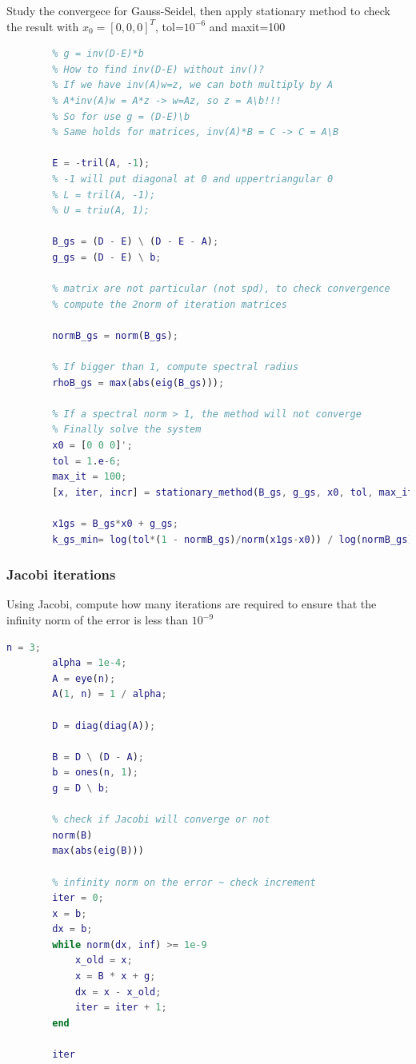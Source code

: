         Study the convergece for Gauss-Seidel, then apply stationary method to check the result with $x_0=[0,0,0]^T$, tol=$10^{-6}$ and maxit=100
        \begin{lstlisting}[language=Matlab, escapeinside=`', gobble=8]
        % GAUSS-SEIDEL
        % g = inv(D-E)*b
        % How to find inv(D-E) without inv()?
        % If we have inv(A)w=z, we can both multiply by A
        % A*inv(A)w = A*z -> w=Az, so z = A\b!!!
        % So for use g = (D-E)\b
        % Same holds for matrices, inv(A)*B = C -> C = A\B
        
        E = -tril(A, -1);
        % -1 will put diagonal at 0 and uppertriangular 0
        % L = tril(A, -1);
        % U = triu(A, 1);
        
        B_gs = (D - E) \ (D - E - A);
        g_gs = (D - E) \ b;
        
        % matrix are not particular (not spd), to check convergence
        % compute the 2norm of iteration matrices
        
        normB_gs = norm(B_gs);
        
        % If bigger than 1, compute spectral radius
        rhoB_gs = max(abs(eig(B_gs)));
        
        % If a spectral norm > 1, the method will not converge
        % Finally solve the system
        x0 = [0 0 0]';
        tol = 1.e-6;
        max_it = 100;
        [x, iter, incr] = stationary_method(B_gs, g_gs, x0, tol, max_it);

        x1gs = B_gs*x0 + g_gs;
        k_gs_min= log(tol*(1 - normB_gs)/norm(x1gs-x0)) / log(normB_gs);
        \end{lstlisting}

    \subsubsection{Jacobi iterations}
        Using Jacobi, compute how many iterations are required to ensure that the infinity norm of the error is less than $10^{-9}$
        \begin{lstlisting}[language=Matlab, escapeinside=`', gobble=8]
        n = 3;
        alpha = 1e-4;
        A = eye(n);
        A(1, n) = 1 / alpha;
        
        D = diag(diag(A));
        
        B = D \ (D - A);        
        b = ones(n, 1);
        g = D \ b;
        
        % check if Jacobi will converge or not
        norm(B)
        max(abs(eig(B)))
        
        % infinity norm on the error ~ check increment
        iter = 0;
        x = b;
        dx = b;        
        while norm(dx, inf) >= 1e-9
            x_old = x;
            x = B * x + g;
            dx = x - x_old;
            iter = iter + 1;
        end
        
        iter
        \end{lstlisting}
    
